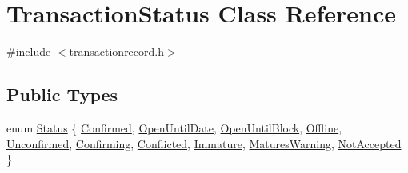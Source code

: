 \hypertarget{class_transaction_status}{}\section{Transaction\+Status Class Reference}
\label{class_transaction_status}


{\ttfamily \#include $<$transactionrecord.\+h$>$}

\subsection*{Public Types}
\begin{DoxyCompactItemize}
\item 
enum \mbox{\hyperlink{class_transaction_status_aaa6cc19ca3509bbae72d0df1661f85cb}{Status}} \{ \newline
\mbox{\hyperlink{class_transaction_status_aaa6cc19ca3509bbae72d0df1661f85cba354f91f2bd2c4be35b366d02fe186e22}{Confirmed}}, 
\mbox{\hyperlink{class_transaction_status_aaa6cc19ca3509bbae72d0df1661f85cba4a0e6eac1d0db61fb9b1c96c6cbe592a}{Open\+Until\+Date}}, 
\mbox{\hyperlink{class_transaction_status_aaa6cc19ca3509bbae72d0df1661f85cbab91223e8b704793715b0e54637417a1c}{Open\+Until\+Block}}, 
\mbox{\hyperlink{class_transaction_status_aaa6cc19ca3509bbae72d0df1661f85cbaf8b9ab6fc1d08781bb94301e358171b6}{Offline}}, 
\newline
\mbox{\hyperlink{class_transaction_status_aaa6cc19ca3509bbae72d0df1661f85cba6aa37fcd802ffec2cc13db46dcc41c03}{Unconfirmed}}, 
\mbox{\hyperlink{class_transaction_status_aaa6cc19ca3509bbae72d0df1661f85cba75c0b79a4c38c5777cdae1a565d6ba5e}{Confirming}}, 
\mbox{\hyperlink{class_transaction_status_aaa6cc19ca3509bbae72d0df1661f85cbae06a462705a0126fda4b82e47915d812}{Conflicted}}, 
\mbox{\hyperlink{class_transaction_status_aaa6cc19ca3509bbae72d0df1661f85cba6b7a65301bf5a9eb371b34f2dcbd0e30}{Immature}}, 
\newline
\mbox{\hyperlink{class_transaction_status_aaa6cc19ca3509bbae72d0df1661f85cba25cc8866b321de53d71467d11bba19b7}{Matures\+Warning}}, 
\mbox{\hyperlink{class_transaction_status_aaa6cc19ca3509bbae72d0df1661f85cbaa00ed76c9186371bd649ffeec45d37e9}{Not\+Accepted}}
 \}
\end{DoxyCompactItemize}
